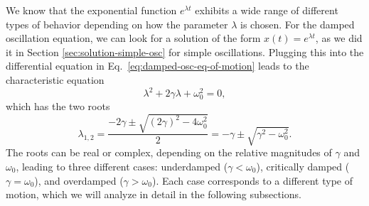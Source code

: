 \documentclass[12pt]{article}
\begin{document}
We know that the exponential function $e^{\lambda t}$ exhibits a wide range of different types of behavior depending on how the parameter $\lambda$ is chosen. For the damped oscillation equation, we can look for a solution of the form $x(t)=e^{\lambda t}$, as we did it in Section \ref{sec:solution-simple-osc} for simple oscillations. Plugging this into the differential equation in Eq.~\ref{eq:damped-osc-eq-of-motion} leads to the characteristic equation
\begin{equation}
    \lambda^2+2\gamma\lambda+\omega_0^2=0,
\end{equation}
which has the two roots
\begin{equation}
    \lambda_{1,2}=\frac{-2\gamma\pm\sqrt{(2\gamma)^2-4\omega_0^2}}{2}=-\gamma\pm\sqrt{\gamma^2-\omega_0^2}.
\end{equation}
The roots can be real or complex, depending on the relative magnitudes of $\gamma$ and $\omega_0$, leading to three different cases: underdamped ($\gamma<\omega_0$), critically damped ($\gamma=\omega_0$), and overdamped ($\gamma>\omega_0$). Each case corresponds to a different type of motion, which we will analyze in detail in the following subsections.
\end{document}
